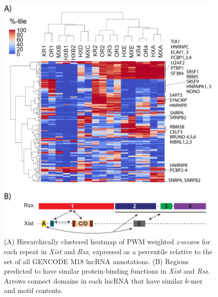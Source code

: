 \begin{figure}[h!]
\centering
\includegraphics[width=.95\textwidth]{images/fig6.pdf}
\caption[Protein-binding motif enrichment in repeats of \emph{Xist} and \emph{Rsx}, and similarity model.]{(A) Hierarchically clustered heatmap of PWM weighted $z$-scores for each repeat in \emph{Xist} and \emph{Rsx}, expressed as a percentile relative to the set of all GENCODE M18 lncRNA annotations. (B) Regions predicted to have similar protein-binding functions in \emph{Xist} and \emph{Rsx}. Arrows connect domains in each lncRNA that have similar $k$-mer and motif contents.}
\label{fig:6}
\end{figure}

